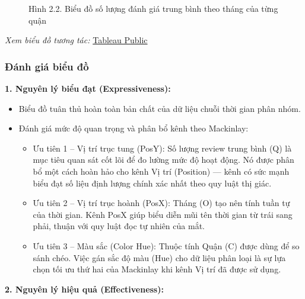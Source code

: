 \begin{figure}[H]
    \centering
    \caption{Hình 2.2. Biểu đồ số lượng đánh giá trung bình theo tháng của từng quận}
    \label{fig:domain-task2-chart2}
\end{figure}

\noindent\small\textit{Xem biểu đồ tương tác: }\href{https://public.tableau.com/app/profile/duy.le4605/viz/Group10_17788537028430/Task2_2-Averagenumberofreviewspermonthforeachdistrict?publish=yes}{Tableau Public}\normalsize

\subsubsection{Đánh giá biểu đồ}

\textbf{1. Nguyên lý biểu đạt (Expressiveness):}

\begin{itemize}
    \item Biểu đồ tuân thủ hoàn toàn bản chất của dữ liệu chuỗi thời gian phân nhóm.
    \item Đánh giá mức độ quan trọng và phân bổ kênh theo Mackinlay:
    \begin{itemize}
        \item Ưu tiên 1 -- Vị trí trục tung (PosY): Số lượng review trung bình (Q) là mục tiêu quan sát cốt lõi để đo lường mức độ hoạt động. Nó được phân bổ một cách hoàn hảo cho kênh Vị trí (Position) --- kênh có sức mạnh biểu đạt số liệu định lượng chính xác nhất theo quy luật thị giác.
        \item Ưu tiên 2 -- Vị trí trục hoành (PosX): Tháng (O) tạo nên tính tuần tự của thời gian. Kênh PosX giúp biểu diễn mũi tên thời gian từ trái sang phải, thuận với quy luật đọc tự nhiên của mắt.
        \item Ưu tiên 3 -- Màu sắc (Color Hue): Thuộc tính Quận (C) được dùng để so sánh chéo. Việc gán sắc độ màu (Hue) cho dữ liệu phân loại là sự lựa chọn tối ưu thứ hai của Mackinlay khi kênh Vị trí đã được sử dụng.
    \end{itemize}
\end{itemize}

\textbf{2. Nguyên lý hiệu quả (Effectiveness):}

